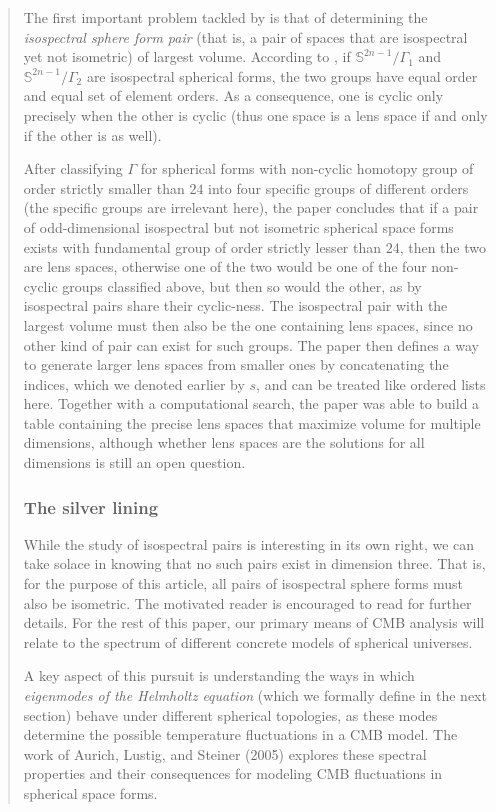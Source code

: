 \documentclass{article}
\theoremstyle{definition}
\begin{document}
\begin{abstract}
The first important problem tackled by \cite{emilio} is that of determining the \textit{isospectral sphere form pair} (that is, a pair of spaces that are isospectral yet not isometric) of largest volume. According to \cite{ikeda80}, if $\mathbb S^{2n-1}/\Gamma_1$ and $\mathbb S^{2n-1}/\Gamma_2$ are isospectral spherical forms, the two groups have equal order and equal set of element orders. As a consequence, one is cyclic only precisely when the other is cyclic (thus one space is a lens space if and only if the other is as well).

After classifying $\Gamma$ for spherical forms with non-cyclic homotopy group of order strictly smaller than $24$ into four specific groups of different orders (the specific groups are irrelevant here), the paper concludes that if a pair of odd-dimensional isospectral but not isometric spherical space forms exists with fundamental group of order strictly lesser than $24$, then the two are lens spaces, otherwise one of the two would be one of the four non-cyclic groups classified above, but then so would the other, as by \cite{ikeda80} isospectral pairs share their cyclic-ness. The isospectral pair with the largest volume must then also be the one containing lens spaces, since no other kind of pair can exist for such groups. The paper then defines a way to generate larger lens spaces from smaller ones by concatenating the indices, which we denoted earlier by $s$, and can be treated like ordered lists here. Together with a computational search, the paper was able to build a table containing the precise lens spaces that maximize volume for multiple dimensions, although whether lens spaces are the solutions for all dimensions is still an open question.


\subsubsection{The silver lining}

While the study of isospectral pairs is interesting in its own right, we can take solace in knowing that no such pairs exist in dimension three. That is, for the purpose of this article, all pairs of isospectral sphere forms must also be isometric. The motivated reader is encouraged to read \cite{emilio} for further details. For the rest of this paper, our primary means of CMB analysis will relate to the spectrum of different concrete models of spherical universes.

A key aspect of this pursuit is understanding the ways in which \emph{eigenmodes of the Helmholtz equation} (which we formally define in the next section) behave under different spherical topologies, as these modes determine the possible temperature fluctuations in a CMB model. The work of Aurich, Lustig, and Steiner (2005) explores these spectral properties and their consequences for modeling CMB fluctuations in spherical space forms.















\end{abstract}
\end{document}
